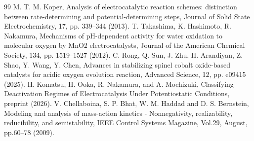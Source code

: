\documentclass[11pt,a4paper]{article}
\begin{document}
\begin{thebibliography}{99}
%
M. T. M. Koper, Analysis of electrocatalytic reaction schemes: distinction between rate-determining and potential-determining steps, Journal of Solid State Electrochemistry, 17, pp. 339--344 (2013).
%
T. Takashima, K. Hashimoto, R. Nakamura, Mechanisms of pH-dependent activity for water oxidation to molecular oxygen by MnO2 electrocatalysts, Journal of the American Chemical Society, 134, pp. 1519--1527 (2012).
%
C. Rong, Q. Sun, J. Zhu, H. Arandiyan, Z. Shao, Y. Wang, Y. Chen, Advances in stabilizing spinel cobalt oxide-based catalysts for acidic oxygen evolution reaction, Advanced Science, 12, pp. e09415 (2025).
%
H. Komatsu, H. Ooka, R. Nakamura, and A. Mochizuki, Classifying Deactivation Regimes of Electrocatalysis Under Potentiostatic Conditions, preprint (2026).
%
V. Chellaboina, S. P. Bhat, W. M. Haddad and D. S. Bernstein,
Modeling and analysis of mass-action kinetics - Nonnegativity, realizability, reducibility, and semistability, IEEE Control Systems Magazine, Vol.29, August, pp.60--78  (2009).
% 
\end{thebibliography}
\end{document}
